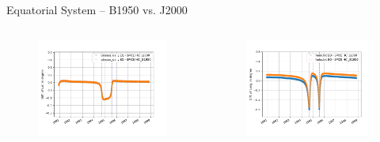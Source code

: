 \documentclass{beamer}
\begin{document}
\begin{frame}{Equatorial System -- B1950 vs. J2000}

\begin{columns}
	\hspace{-1cm}
	\begin{figure}									
		\includegraphics[width=1.25\textwidth]{Pics/EQ_LAT_J_B.png}
	\end{figure}
	\begin{figure}									
		\includegraphics[width=1.25\textwidth]{Pics/EQ_LONG_J_B.png}
	\end{figure}
\end{columns}
\end{frame}
\end{document}
